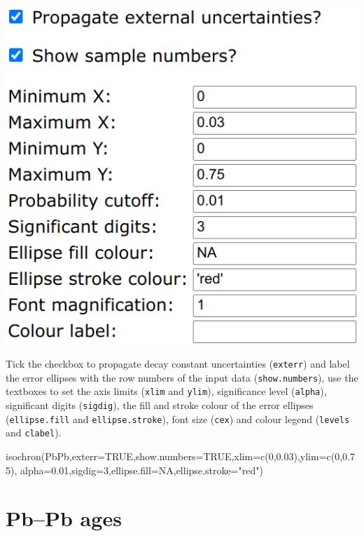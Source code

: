 \begin{refsection}
\begin{enumerate}
\noindent\begin{minipage}[t]{.4\linewidth}
\strut\vspace*{-\baselineskip}\newline
\includegraphics[width=\linewidth]{../figures/PbPbIsochronOtherOptions.png}
\end{minipage}
\begin{minipage}[t]{.6\linewidth}
  Tick the checkbox to propagate decay constant uncertainties
  (\texttt{exterr}) and label the error ellipses with the row numbers
  of the input data (\texttt{show.numbers}), use the textboxes to set
  the axis limits (\texttt{xlim} and \texttt{ylim}), significance
  level (\texttt{alpha}), significant digits (\texttt{sigdig}), the
  fill and stroke colour of the error ellipses (\texttt{ellipse.fill}
  and \texttt{ellipse.stroke}), font size (\texttt{cex}) and colour
  legend (\texttt{levels} and \texttt{clabel}).  
\end{minipage}

\begin{script}
isochron(PbPb,exterr=TRUE,show.numbers=TRUE,xlim=c(0,0.03),ylim=c(0,0.75),
         alpha=0.01,sigdig=3,ellipse.fill=NA,ellipse.stroke="red")
\end{script}
  
\end{enumerate}

\section{Pb--Pb ages}\label{sec:PbPbAges}


\end{refsection}
